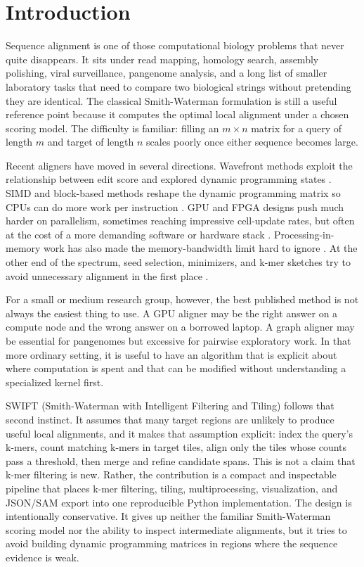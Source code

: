 \documentclass[11pt]{article}
\begin{document}
\section{Introduction}
Sequence alignment is one of those computational biology problems that never quite disappears. It sits under read mapping, homology search, assembly polishing, viral surveillance, pangenome analysis, and a long list of smaller laboratory tasks that need to compare two biological strings without pretending they are identical. The classical Smith-Waterman formulation is still a useful reference point because it computes the optimal local alignment under a chosen scoring model. The difficulty is familiar: filling an $m \times n$ matrix for a query of length $m$ and target of length $n$ scales poorly once either sequence becomes large.

Recent aligners have moved in several directions. Wavefront methods exploit the relationship between edit score and explored dynamic programming states \citep{marcosola2021wfa,aguadopuig2023wfagpu}. SIMD and block-based methods reshape the dynamic programming matrix so CPUs can do more work per instruction \citep{liu2023blockaligner}. GPU and FPGA designs push much harder on parallelism, sometimes reaching impressive cell-update rates, but often at the cost of a more demanding software or hardware stack \citep{schmidt2024cudasw4,aguadopuig2022wfa_gpu_access,alvarez2023wfafpga,perezwohlfeil2023gpu_irregular}. Processing-in-memory work has also made the memory-bandwidth limit hard to ignore \citep{diab2023aim,diab2022wfa_pim}. At the other end of the spectrum, seed selection, minimizers, and k-mer sketches try to avoid unnecessary alignment in the first place \citep{shaw2022local_kmer_selection,yu2024minimizers_filters,hoang2024masked_minimizer,marcais2024small_window,ndiaye2024minimizers_review}.

For a small or medium research group, however, the best published method is not always the easiest thing to use. A GPU aligner may be the right answer on a compute node and the wrong answer on a borrowed laptop. A graph aligner may be essential for pangenomes but excessive for pairwise exploratory work. In that more ordinary setting, it is useful to have an algorithm that is explicit about where computation is spent and that can be modified without understanding a specialized kernel first.

SWIFT (Smith-Waterman with Intelligent Filtering and Tiling) follows that second instinct. It assumes that many target regions are unlikely to produce useful local alignments, and it makes that assumption explicit: index the query's k-mers, count matching k-mers in target tiles, align only the tiles whose counts pass a threshold, then merge and refine candidate spans. This is not a claim that k-mer filtering is new. Rather, the contribution is a compact and inspectable pipeline that places k-mer filtering, tiling, multiprocessing, visualization, and JSON/SAM export into one reproducible Python implementation. The design is intentionally conservative. It gives up neither the familiar Smith-Waterman scoring model nor the ability to inspect intermediate alignments, but it tries to avoid building dynamic programming matrices in regions where the sequence evidence is weak.
\end{document}
